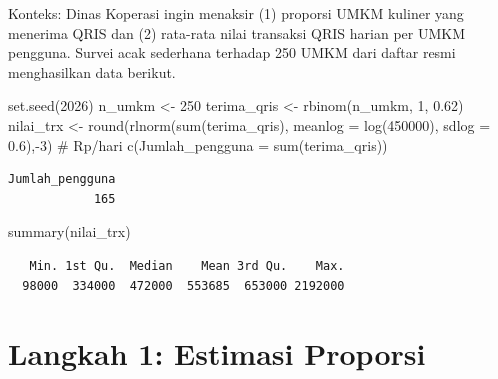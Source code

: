 \documentclass[
  indonesian,
  letterpaper,
]{book}
\newenvironment{Shaded}{\begin{snugshade}}{\end{snugshade}}
\newcommand{\AttributeTok}[1]{\textcolor[rgb]{0.40,0.45,0.13}{#1}}
\newcommand{\CommentTok}[1]{\textcolor[rgb]{0.37,0.37,0.37}{#1}}
\newcommand{\DecValTok}[1]{\textcolor[rgb]{0.68,0.00,0.00}{#1}}
\newcommand{\FloatTok}[1]{\textcolor[rgb]{0.68,0.00,0.00}{#1}}
\newcommand{\FunctionTok}[1]{\textcolor[rgb]{0.28,0.35,0.67}{#1}}
\newcommand{\NormalTok}[1]{\textcolor[rgb]{0.00,0.23,0.31}{#1}}
\newcommand{\OtherTok}[1]{\textcolor[rgb]{0.00,0.23,0.31}{#1}}
\newcommand{\SpecialCharTok}[1]{\textcolor[rgb]{0.37,0.37,0.37}{#1}}
\begin{document}
Konteks: Dinas Koperasi ingin menaksir (1) proporsi UMKM kuliner yang
menerima QRIS dan (2) rata-rata nilai transaksi QRIS harian per UMKM
pengguna. Survei acak sederhana terhadap 250 UMKM dari daftar resmi
menghasilkan data berikut.

\begin{Shaded}
\begin{Highlighting}[]
\FunctionTok{set.seed}\NormalTok{(}\DecValTok{2026}\NormalTok{)}
\NormalTok{n\_umkm }\OtherTok{\textless{}{-}} \DecValTok{250}
\NormalTok{terima\_qris }\OtherTok{\textless{}{-}} \FunctionTok{rbinom}\NormalTok{(n\_umkm, }\DecValTok{1}\NormalTok{, }\FloatTok{0.62}\NormalTok{)}
\NormalTok{nilai\_trx }\OtherTok{\textless{}{-}} \FunctionTok{round}\NormalTok{(}\FunctionTok{rlnorm}\NormalTok{(}\FunctionTok{sum}\NormalTok{(terima\_qris), }\AttributeTok{meanlog =} \FunctionTok{log}\NormalTok{(}\DecValTok{450000}\NormalTok{), }\AttributeTok{sdlog =} \FloatTok{0.6}\NormalTok{),}\SpecialCharTok{{-}}\DecValTok{3}\NormalTok{) }\CommentTok{\# Rp/hari}
\FunctionTok{c}\NormalTok{(}\AttributeTok{Jumlah\_pengguna =} \FunctionTok{sum}\NormalTok{(terima\_qris))}
\end{Highlighting}
\end{Shaded}

\begin{verbatim}
Jumlah_pengguna 
            165 
\end{verbatim}

\begin{Shaded}
\begin{Highlighting}[]
\FunctionTok{summary}\NormalTok{(nilai\_trx)}
\end{Highlighting}
\end{Shaded}

\begin{verbatim}
   Min. 1st Qu.  Median    Mean 3rd Qu.    Max. 
  98000  334000  472000  553685  653000 2192000 
\end{verbatim}

\section{Langkah 1: Estimasi
Proporsi}\label{langkah-1-estimasi-proporsi}
\end{document}
